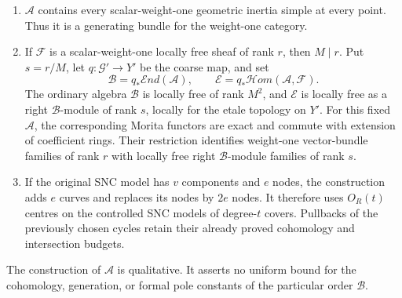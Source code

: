 \begin{proposition}
\begin{enumerate}
\item \(\mathcal A\) contains every scalar-weight-one
geometric inertia simple at every point. Thus it is a
generating bundle for the weight-one category.
\item If \(\mathcal F\) is a scalar-weight-one locally
free sheaf of rank \(r\), then \(M\mid r\).
Put \(s=r/M\), let \(q:\mathcal G'\to Y'\) be the
coarse map, and set
\[
 \mathcal B=q_*\mathcal End(\mathcal A),\qquad
 \mathcal E=q_*\mathcal Hom(\mathcal A,\mathcal F).
                                                        \tag{D.RA.1}
\]
The ordinary algebra \(\mathcal B\) is locally free of
rank \(M^2\), and \(\mathcal E\) is locally free as a
right \(\mathcal B\)-module of rank \(s\), locally for
the etale topology on \(Y'\).
For this fixed \(\mathcal A\), the corresponding Morita
functors are exact and commute with extension of
coefficient rings. Their restriction identifies
weight-one vector-bundle families of rank \(r\) with
locally free right \(\mathcal B\)-module families of
rank \(s\).
\item If the original SNC model has \(v\) components
and \(e\) nodes, the construction adds \(e\) curves
and replaces its nodes by \(2e\) nodes. It therefore
uses \(O_R(t)\) centres on the controlled SNC models
of degree-\(t\) covers. Pullbacks of the previously
chosen cycles retain their already proved cohomology
and intersection budgets.
\end{enumerate}
The construction of \(\mathcal A\) is qualitative.
It asserts no uniform bound for the cohomology,
generation, or formal pole constants of the
particular order \(\mathcal B\).
\end{proposition}

